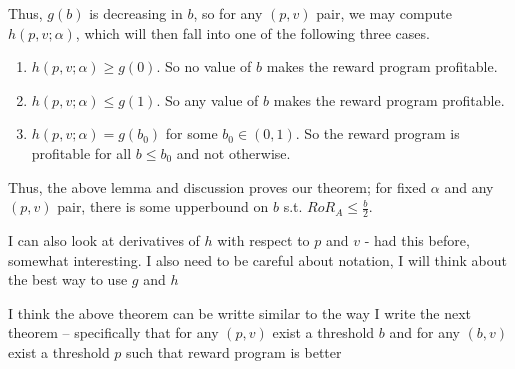 Thus, $g(b)$ is decreasing in $b$, so for any $(p,v)$ pair, we may compute $h(p, v; \alpha)$, which will then fall into one of the following three cases.
\begin{enumerate}
\item
$h(p,v;\alpha) \geq g(0)$. So no value of $b$ makes the reward program profitable.
\item
$h(p,v;\alpha) \leq g(1)$. So any value of $b$ makes the reward program profitable.
\item
$h(p,v;\alpha) = g(b_0)$ for some $b_0 \in (0,1)$. So the reward program is profitable for all $b \leq b_0$ and not otherwise.
\end{enumerate}

Thus, the above lemma and discussion proves our theorem; for fixed $\alpha$ and any $(p,v)$ pair, there is some upperbound on $b$ s.t. $RoR_A \leq \frac{b}{2}$. 

{\nolan I can also look at derivatives of $h$ with respect to $p$ and $v$ - had this before, somewhat interesting. I also need to be careful about notation, I will think about the best way to use $g$ and $h$}

{\arpit I think the above theorem can be writte similar to the way I write the next theorem -- specifically that for any $(p,v)$ exist a threshold $b$ and for any $(b,v)$ exist a threshold $p$ such that reward program is better
}

